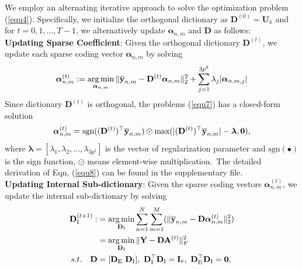 \documentclass[10pt,twocolumn,letterpaper]{article}
\DeclareMathOperator*{\argmin}{arg\,min}
\begin{document}
We employ an alternating iterative approach to solve the optimization problem (\ref{equ4}). Specifically, we initialize the orthogonal dictionary as $\mathbf{D}^{(0)}=\mathbf{U}_{k}$ and for $t=0,1, ...,T-1$, we alternatively update $\bm{\alpha}_{n,m}$ and $\mathbf{D}$ as follows:
\vspace{2mm}\\
\textbf{Updating Sparse Coefficient}: Given the orthogonal dictionary $\textbf{D}^{(t)}$, we update each sparse coding vector $\bm{\alpha}_{n,m}$ by solving
\vspace{-3mm}
\begin{equation}\label{equ7}\vspace{-3mm}
\begin{split}
\bm{\alpha}_{n,m}^{(t)}:=\argmin_{\bm{\alpha}_{n,m}}
\|\mathbf{\overline{y}}_{n,m}-\mathbf{D}^{(t)}\bm{\alpha}_{n,m}\|_{2}^{2}+\sum_{j=1}^{3p^{2}}\lambda_{j}|\bm{\alpha}_{n,m,j}|
\end{split}
\end{equation}
Since dictionary $\mathbf{D}^{(t)}$ is orthogonal, the problems (\ref{equ7}) has a closed-form solution
\vspace{-2mm}
\begin{equation}\label{equ8}\vspace{-2mm}
\bm{\alpha}_{n,m}^{(t)}= \text{sgn}((\mathbf{D}^{(t)})^{\top}\mathbf{\overline{y}}_{n,m})\odot \text{max}(|(\mathbf{D}^{(t)})^{\top}\mathbf{\overline{y}}_{n,m}|-\bm{\lambda},\mathbf{0}),
\end{equation}
where $\bm{\lambda} = [\lambda_{1},\lambda_{2},...,\lambda_{3p^2}]$ is the vector of regularization parameter and $\text{sgn}(\bullet)$ is the sign function, $\odot$ means element-wise multiplication.\ The detailed derivation of Eqn. (\ref{equ8}) can be found in the supplementary file.
\vspace{2mm}\\
\textbf{Updating Internal Sub-dictionary}: Given the sparse coding vectors $\bm{\alpha}_{n,m}^{(t)}$, we update the internal sub-dictionary by solving
\vspace{-2mm}
\begin{equation}\label{equ9} \vspace{-2mm}
\begin{split}
\textbf{D}_{\text{I}}^{(t+1)}
:
&
=
\argmin_{\textbf{D}_{\text{I}}}
\sum_{n=1}^{N}\sum_{m=1}^{M}(\|\mathbf{\overline{y}}_{n,m}-\mathbf{D}\bm{\alpha}_{n,m}^{(t)}\|_{2}^{2})
\\
&
=
\argmin_{\textbf{D}_{\text{I}}}
\|\mathbf{Y}-\mathbf{D}\mathbf{A}^{(t)}\|_{F}^{2}
\\
s.t.
\quad
\mathbf{D}
&
=
[\mathbf{D}_{\text{E}}\ \mathbf{D}_{\text{I}}],\ \mathbf{D}_{\text{I}}^{\top}\mathbf{D}_{\text{I}} = \mathbf{I}_{r},\ \mathbf{D}_{\text{E}}^{\top}\mathbf{D}_{\text{I}} = \mathbf{0},
\end{split}
\end{equation}
\end{document}
